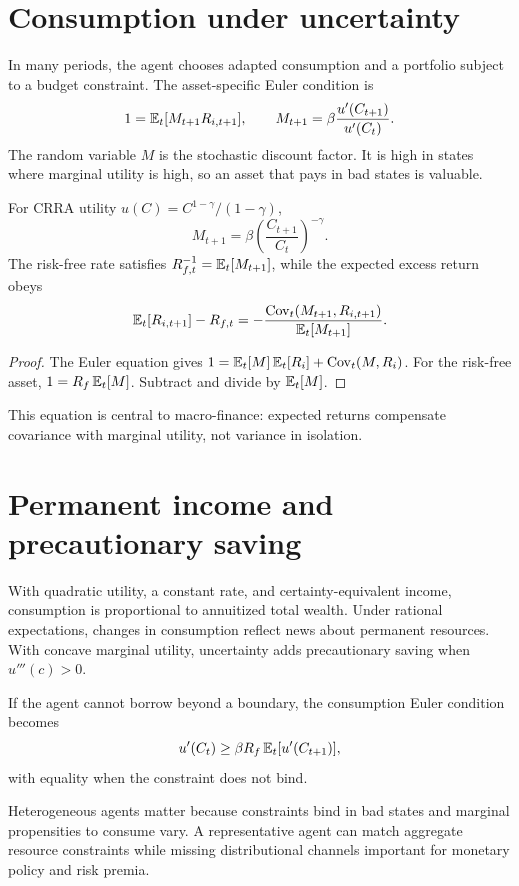 \section{Consumption under uncertainty}

In many periods, the agent chooses adapted consumption and a portfolio subject to a
budget constraint. The asset-specific Euler condition is
\[
1=\operatorname{\mathbb E}_t[M_{t+1}R_{i,t+1}],\qquad
M_{t+1}=\beta\frac{u'(C_{t+1})}{u'(C_t)}.
\]
The random variable $M$ is the stochastic discount factor. It is high in states
where marginal utility is high, so an asset that pays in bad states is valuable.

For CRRA utility $u(C)=C^{1-\gamma}/(1-\gamma)$,
\[
M_{t+1}=\beta\left(\frac{C_{t+1}}{C_t}\right)^{-\gamma}.
\]
The risk-free rate satisfies $R_{f,t}^{-1}=\operatorname{\mathbb E}_t[M_{t+1}]$, while the expected excess
return obeys
\[
\operatorname{\mathbb E}_t[R_{i,t+1}]-R_{f,t}
=-\frac{\operatorname{Cov}_t(M_{t+1},R_{i,t+1})}{\operatorname{\mathbb E}_t[M_{t+1}]}.
\]

\begin{proof}
The Euler equation gives
$1=\operatorname{\mathbb E}_t[M]\operatorname{\mathbb E}_t[R_i]+\operatorname{Cov}_t(M,R_i)$.
For the risk-free asset, $1=R_f\operatorname{\mathbb E}_t[M]$. Subtract and divide by $\operatorname{\mathbb E}_t[M]$.
\end{proof}

This equation is central to macro-finance: expected returns compensate covariance
with marginal utility, not variance in isolation.

\section{Permanent income and precautionary saving}

With quadratic utility, a constant rate, and certainty-equivalent income, consumption
is proportional to annuitized total wealth. Under rational expectations, changes in
consumption reflect news about permanent resources. With concave marginal utility,
uncertainty adds precautionary saving when $u'''(c)>0$.

\begin{proposition}
If the agent cannot borrow beyond a boundary, the consumption Euler condition
becomes
\[
u'(C_t)\geq\beta R_f\operatorname{\mathbb E}_t[u'(C_{t+1})],
\]
with equality when the constraint does not bind.
\end{proposition}

Heterogeneous agents matter because constraints bind in bad states and marginal
propensities to consume vary. A representative agent can match aggregate resource
constraints while missing distributional channels important for monetary policy and
risk premia.

